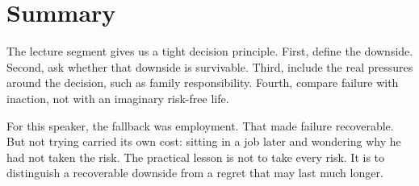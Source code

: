 \section{Summary}

The lecture segment gives us a tight decision principle. First, define the downside. Second, ask whether that downside is survivable. Third, include the real pressures around the decision, such as family responsibility. Fourth, compare failure with inaction, not with an imaginary risk-free life.

For this speaker, the fallback was employment. That made failure recoverable. But not trying carried its own cost: sitting in a job later and wondering why he had not taken the risk. The practical lesson is not to take every risk. It is to distinguish a recoverable downside from a regret that may last much longer.